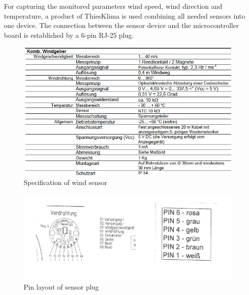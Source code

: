For capturing the monitored parameters wind speed, wind direction and temperature, a product of ThiesKlima is used combining all needed sensors into one device. The connection between the sensor device and the microcontroller board is established by a 6-pin RJ-25 plug.

\begin{figure}[ht]
    \centering
    \includegraphics[width=0.8\linewidth]{graphics/windsensor_specs.jpg}
    \caption{Specification of wind sensor}
    \label{fig:windsensor_spec}
\end{figure}

\begin{figure}[ht]
    \centering
    \includegraphics{graphics/windsensor_pinlayout.jpg}
    \caption{Pin layout of sensor plug}
    \label{fig:windsensor_pinlayout}
\end{figure}

\newpage
